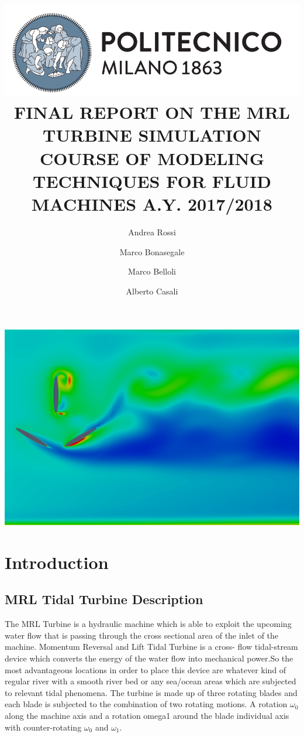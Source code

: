 \documentclass[a4paper,12pt]{article}
\title{
\includegraphics[scale=0.4]{images/logo.png}
\\[1cm]
FINAL REPORT ON THE  MRL TURBINE SIMULATION
COURSE OF MODELING TECHNIQUES FOR FLUID MACHINES 
A.Y. 2017/2018}
\author{
Andrea Rossi \and Marco Bonasegale
\and Marco Belloli \and Alberto Casali
}
\date{}
\begin{document}
\maketitle
\begin{center}
\includegraphics[width=\textwidth]{images/cover.png}
\end{center}

\newpage

\tableofcontents

\newpage

\section{Introduction}

\subsection{MRL Tidal Turbine Description}
The MRL Turbine is a hydraulic machine which is able to exploit the upcoming  water flow that is passing through the cross sectional area of the inlet of the machine. Momentum Reversal and Lift Tidal Turbine is a cross-
flow tidal-stream device which converts
 the energy of the water
flow into mechanical power.So the most advantageous locations in order to place this device are whatever kind of regular river with a smooth river bed or any sea/ocean areas which are subjected to relevant tidal phenomena.
The turbine is made up of three rotating blades and each blade is subjected to the combination of two rotating motions. A rotation $\omega_0$ along the machine axis  and a rotation omega1 around the blade individual axis with counter-rotating $\omega_0$ and $\omega_1$.
\end{document}
